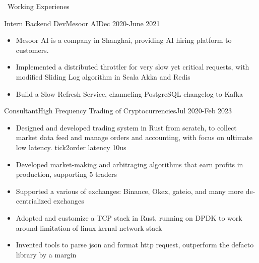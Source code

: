 \documentclass{resume}
\begin{document}
\begin{rSection}{\faUsers~Working Experienes}
    \begin{rExperience}{Intern Backend Dev}{Mesoor AI}{Dec 2020-June 2021}
        \begin{itemize}
            \itemsep -0.5em \vspace{-0.5em}
            \item Mesoor AI is a company in Shanghai, providing AI hiring platform to customers.
            \item Implemented a distributed throttler for very slow yet critical requests, with modified Sliding Log algorithm in Scala Akka and Redis
            \item Build a Slow Refresh Service, channeling PostgreSQL changelog to Kafka       
        \end{itemize}
    \end{rExperience}
    \begin{rExperience}{Consultant}{High Frequency Trading of Cryptocurrencies}{Jul 2020-Feb 2023}
        \begin{itemize}
            \itemsep -0.5em \vspace{-0.5em}
            \item Designed and developed trading system in Rust from scratch, to collect market data feed and manage orders and accounting, with focus on ultimate low latency. tick2order latency 10us
            \item Developed market-making and arbitraging algorithms that earn profits in production, supporting 5 traders
            \item Supported a various of exchanges: Binance, Okex, gateio, and many more de-centrialized exchanges
            \item Adopted and customize a TCP stack in Rust, running on DPDK to work around limitation of linux kernal network stack
            \item Invented tools to parse json and format http request, outperform the defacto library by a margin
        \end{itemize}
    \end{rExperience}

\end{rSection}
\end{document}
